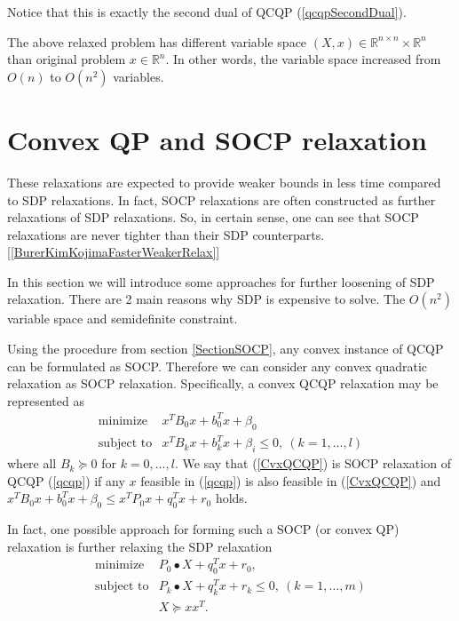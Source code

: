 \documentclass[12pt]{book}
\theoremstyle{definition}
\begin{document}
\rem Notice that this is exactly the second dual of QCQP (\ref{qcqpSecondDual}).




The above relaxed problem has different variable space $(X,x)\in \mathbb{R}^{n\times n}\times \mathbb{R}^n$ than original problem $x\in \mathbb{R}^n$. 
In other words, the variable space increased from $O(n)$ to $O(n^2)$ variables.


\section{Convex QP and SOCP relaxation}

These relaxations are expected to provide weaker bounds in less time compared to SDP relaxations. In fact, SOCP relaxations are often constructed as further relaxations of SDP relaxations. So, in certain sense, one can see that SOCP relaxations are never tighter than their SDP counterparts. [\ref{BurerKimKojimaFasterWeakerRelax}]


In this section we will introduce some approaches for further loosening of SDP relaxation. There are 2 main reasons why SDP is expensive to solve. The $O(n^2)$ variable space and semidefinite constraint. 


Using the procedure from section \ref{SectionSOCP}, any convex instance of QCQP can be formulated as SOCP. Therefore we can consider any convex quadratic relaxation as SOCP relaxation. 
Specifically, a convex QCQP relaxation may be represented as 
\begin{equation}
\label{CvxQCQP} 
\begin{array}{ll}
\mbox{minimize}& x^TB_0x + b_0^Tx + \beta_0\\
\mbox{subject to}& x^TB_kx + b_k^Tx + \beta_i \leq 0, \  (k = 1,\dots ,l)
\end{array} 
\end{equation}
where all $B_k\succeq 0$ for $k=0,\dots ,l$. We say that (\ref{CvxQCQP}) is SOCP relaxation of QCQP (\ref{qcqp}) if any $x$ feasible in (\ref{qcqp}) is also feasible in (\ref{CvxQCQP}) and $x^TB_0x+b_0^Tx + \beta_0 \leq x^TP_0x+q_0^Tx+r_0$ holds.

In fact, one possible approach for forming such a SOCP (or convex QP) relaxation is further relaxing the SDP relaxation 
\begin{equation}
\label{SDPRelaxSOCPsection}
\begin{array}{ll}
\mbox{minimize}& P_0\bullet X + q_0^Tx + r_0,\\
\mbox{subject to}& P_k\bullet X+ q_k^Tx + r_k \leq 0, \  (k = 1,\dots ,m)\\
& X\succeq xx^T.
\end{array} 
\end{equation}
\end{document}
